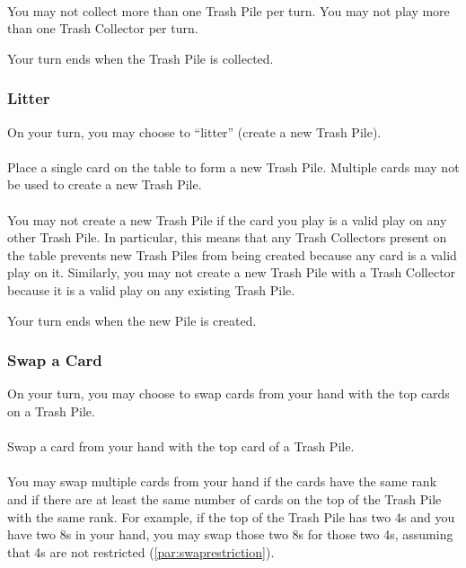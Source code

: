 \documentclass{article}
\begin{document}
\paragraph{} \label{par:collectsingle}
You may not collect more than one Trash Pile per turn. You may not play more than one Trash Collector per turn.

Your turn ends when the Trash Pile is collected.

\subsubsection{Litter}
\label{sec:litter}

On your turn, you may choose to ``litter'' (create a new Trash Pile).

\paragraph{} \label{par:littercreate}
Place a single card on the table to form a new Trash Pile. Multiple cards may not be used to create a new Trash Pile.

\paragraph{} \label{par:litterrestriction}
You may not create a new Trash Pile if the card you play is a valid play on any other Trash Pile. In particular, this means that any Trash Collectors present on the table prevents new Trash Piles from being created because any card is a valid play on it. Similarly, you may not create a new Trash Pile with a Trash Collector because it is a valid play on any existing Trash Pile.

Your turn ends when the new Pile is created.

\subsubsection{Swap a Card}
\label{sec:swap}

On your turn, you may choose to swap cards from your hand with the top cards on a Trash Pile.

\paragraph{} \label{par:swaptop}
Swap a card from your hand with the top card of a Trash Pile.

\paragraph{} \label{par:swapmultiple}
You may swap multiple cards from your hand if the cards have the same rank and if there are at least the same number of cards on the top of the Trash Pile with the same rank. For example, if the top of the Trash Pile has two 4s and you have two 8s in your hand, you may swap those two 8s for those two 4s, assuming that 4s are not restricted (\autoref{par:swaprestriction}).
\end{document}
